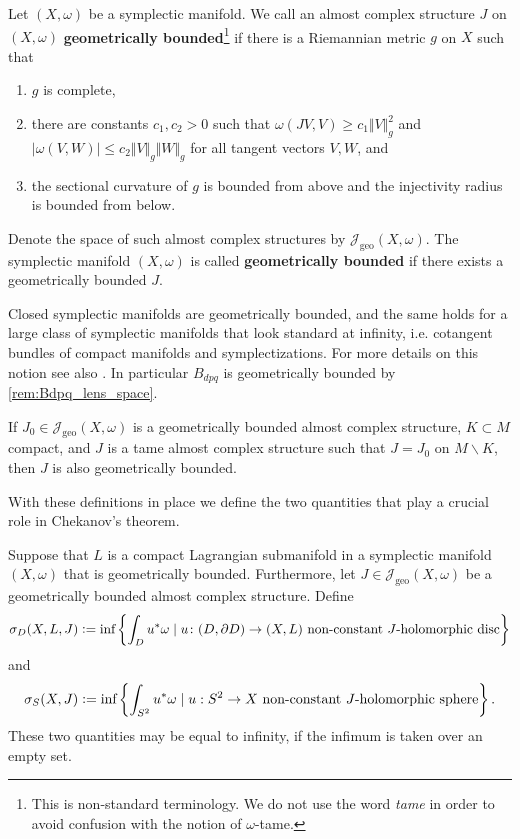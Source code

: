 \documentclass[12pt,a4paper,draft]{scrartcl}
\begin{document}
\begin{definition}
    \label{def:geobdd}
    Let $(X,\omega)$ be a symplectic manifold. We call an almost complex structure $J$ on $(X,\omega)$ \textbf{geometrically bounded}\footnote{This is non-standard terminology. We do not use the word \textit{tame} in order to avoid confusion with the notion of $\omega$-tame.} if there is a Riemannian metric $g$ on $X$ such that 
    \begin{enumerate}
        \item $g$ is complete,
        \item there are constants $c_1,c_2 > 0$ such that $\omega(JV,V) \geqslant c_1 \Vert V \Vert_g^2$ and $\vert \omega(V,W) \vert \leqslant c_2 \Vert V \Vert_g \Vert W \Vert_g$ for all tangent vectors $V,W$, and
        \item the sectional curvature of $g$ is bounded from above and the injectivity radius is bounded from below.
    \end{enumerate}
    Denote the space of such almost complex structures by $\mathcal{J}_{\text{geo}}(X,\omega)$.
    The symplectic manifold $(X,\omega)$ is called \textbf{geometrically bounded} if there exists a geometrically bounded $J$. 
\end{definition}

\begin{remark}
  \label{rem:Bdpq_geometrically_bounded}
    Closed symplectic manifolds are geometrically bounded, and the same holds for a large class of symplectic manifolds that look standard at infinity, i.e. cotangent bundles of compact manifolds and symplectizations. For more details on this notion see also \cite[Chapter X, Definition 2.2.1]{AudLaf94}. In particular $B_{dpq}$ is geometrically bounded by \cref{rem:Bdpq_lens_space}.
\end{remark}
\begin{remark}
  \label{rem:J_compactly_perturbed}
  If $J_0 \in \mathcal{J}_\text{geo}(X,ω)$ is a geometrically bounded almost complex structure, $K ⊂ M$ compact, and $J$ is a tame almost complex structure such that $J = J_0$ on $M ∖ K$, then $J$ is also geometrically bounded.
\end{remark}

With these definitions in place we define the two quantities that play a crucial role in Chekanov's theorem.

\begin{definition}
    Suppose that $L$ is a compact Lagrangian submanifold in a symplectic manifold $(X,\omega)$ that is geometrically bounded. Furthermore, let $J \in \mathcal{J}_{\text{geo}}(X,\omega)$ be a geometrically bounded almost complex structure. Define
    \[
        \sigma_D(X,L,J)\vcentcolon=\text{inf} \left\{  \int_{D} u^* \omega \mid u\colon(D,\partial D)\to(X,L) \text{ non-constant $J$-holomorphic disc}   \right\}
    \]
    and 
    \[
        \sigma_S(X,J)\vcentcolon=\text{inf}\left\{ \int_{S^2} u^* \omega \mid u:S^2 \to X \text{ non-constant $J$-holomorphic sphere}   \right\}.
    \]
    These two quantities may be equal to infinity, if the infimum is taken over an empty set.
\end{definition}
\end{document}
